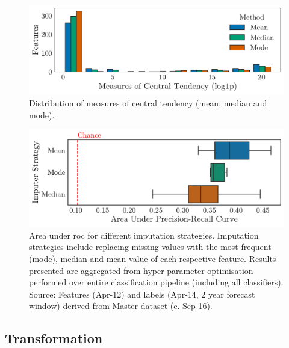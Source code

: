 \documentclass[../thesis/thesis.tex]{subfiles}
\begin{document}
\begin{figure}[!htb]
    \centering
    \includegraphics[width=\textwidth]{../figures/design/distribution_central_tendency}
    \caption[Distribution of central tendency]{Distribution of measures of central tendency (mean, median and mode).}
    \label{fig:design:central_tendency}
\end{figure}

\begin{figure}[!htb]
    \centering
    \includegraphics[width=\textwidth]{../figures/design/auc_imputer}
    \caption[Area under PR Curves by imputation strategy]{Area under \gls{roc} for different imputation strategies. Imputation strategies include replacing missing values with the most frequent (mode), median and mean value of each respective feature. Results presented are aggregated from hyper-parameter optimisation performed over entire classification pipeline (including all classifiers). Source: Features (Apr-12) and labels (Apr-14, 2 year forecast window) derived from Master dataset (c. Sep-16).}
    \label{fig:design:imputer}
\end{figure}

\subsection{Transformation}
\end{document}
